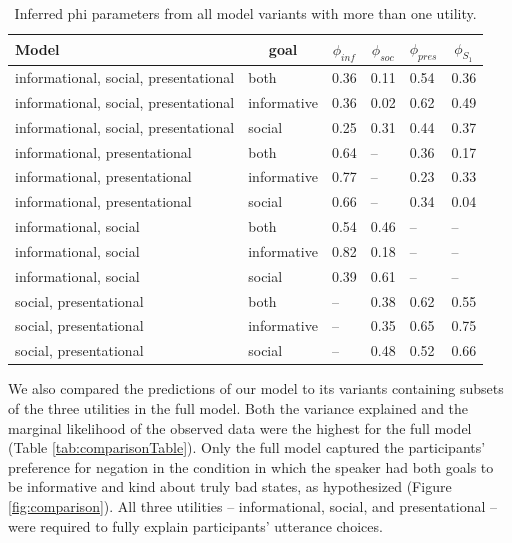 \documentclass[floatsintext,man]{apa6}
\theoremstyle{definition}
\theoremstyle{definition}
\theoremstyle{definition}
\theoremstyle{remark}
\begin{document}
\begin{table}[tbp]
\begin{center}
\begin{threeparttable}
\caption{\label{tab:phi}Inferred phi parameters from all model variants with more than one utility.}
\begin{tabular}{llllll}
\toprule
Model & \multicolumn{1}{c}{goal} & \multicolumn{1}{c}{$\phi_{inf}$} & \multicolumn{1}{c}{$\phi_{soc}$} & \multicolumn{1}{c}{$\phi_{pres}$} & \multicolumn{1}{c}{$\phi_{S_1}$}\\
\midrule
informational, social, presentational & both & 0.36 & 0.11 & 0.54 & 0.36\\
informational, social, presentational & informative & 0.36 & 0.02 & 0.62 & 0.49\\
informational, social, presentational & social & 0.25 & 0.31 & 0.44 & 0.37\\
informational, presentational & both & 0.64 & -- & 0.36 & 0.17\\
informational, presentational & informative & 0.77 & -- & 0.23 & 0.33\\
informational, presentational & social & 0.66 & -- & 0.34 & 0.04\\
informational, social & both & 0.54 & 0.46 & -- & --\\
informational, social & informative & 0.82 & 0.18 & -- & --\\
informational, social & social & 0.39 & 0.61 & -- & --\\
social, presentational & both & -- & 0.38 & 0.62 & 0.55\\
social, presentational & informative & -- & 0.35 & 0.65 & 0.75\\
social, presentational & social & -- & 0.48 & 0.52 & 0.66\\
\bottomrule
\end{tabular}
\end{threeparttable}
\end{center}
\end{table}

We also compared the predictions of our model to its variants containing
subsets of the three utilities in the full model. Both the variance
explained and the marginal likelihood of the observed data were the
highest for the full model (Table \ref{tab:comparisonTable}). Only the
full model captured the participants' preference for negation in the
condition in which the speaker had both goals to be informative and kind
about truly bad states, as hypothesized (Figure \ref{fig:comparison}).
All three utilities -- informational, social, and presentational -- were
required to fully explain participants' utterance choices.
\end{document}
